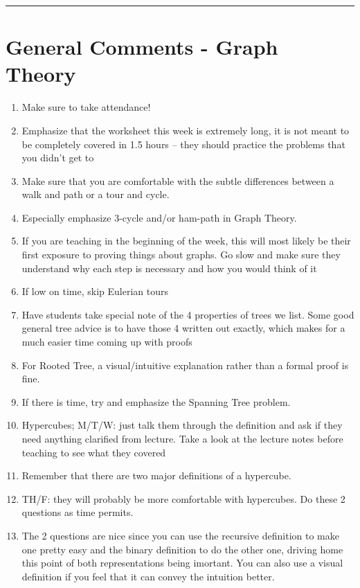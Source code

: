 \documentclass{exam}
\title{}
\date{Graphs, Trees, Hypercubes}
\begin{document}
\maketitle
\rule{\textwidth}{0.15em}
\fontsize{12}{15}\selectfont
\thispagestyle{empty}


\section{General Comments - Graph Theory}
\begin{enumerate}
\item Make sure to take attendance!
\item Emphasize that the worksheet this week is extremely long, it is not meant to be completely covered in 1.5 hours -- they should practice the problems that you didn’t get to
\item Make sure that you are comfortable with the subtle differences between a walk and path or a tour and cycle. 
\item Especially emphasize 3-cycle and/or ham-path in Graph Theory.
\item If you are teaching in the beginning of the week, this will most likely be their first exposure to proving things about graphs. Go slow and make sure they understand why each step is necessary and how you would think of it
\item If low on time, skip Eulerian tours
\item Have students take special note of the 4 properties of trees we list. Some good general tree advice is to have those 4 written out exactly, which makes for a much easier time coming up with proofs
\item For Rooted Tree, a visual/intuitive explanation rather than a formal proof is fine. 
\item If there is time, try and emphasize the Spanning Tree problem.
\item Hypercubes; M/T/W: just talk them through the definition and ask if they need anything clarified from lecture. Take a look at the lecture notes before teaching to see what they covered
\item Remember that there are two major definitions of a hypercube. 
\item TH/F: they will probably be more comfortable with hypercubes. Do these 2 questions as time permits.
\item The 2 questions are nice since you can use the recursive definition to make one pretty easy and the binary definition to do the other one, driving home this point of both representations being imortant. You can also use a visual definition if you feel that it can convey the intuition better.
\end{enumerate}
\end{document}
